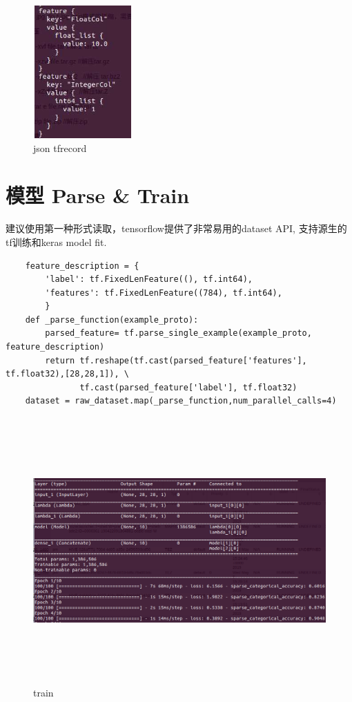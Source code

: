 \documentclass[12pt,a4paper,oneside]{article}
\begin{document}
\begin{CJK*}{UTF8}{gbsn}
\begin{figure}[H]
\centering
\includegraphics[width=1.5in,height=2in]{print2}
\caption{ json tfrecord}
\end{figure}

\section{模型 Parse \& Train}
建议使用第一种形式读取，tensorflow提供了非常易用的dataset API, 支持源生的tf训练和keras model fit.
\begin{lstlisting}
    feature_description = {
        'label': tf.FixedLenFeature((), tf.int64),
        'features': tf.FixedLenFeature((784), tf.int64),
        }
    def _parse_function(example_proto):
        parsed_feature= tf.parse_single_example(example_proto, feature_description)
        return tf.reshape(tf.cast(parsed_feature['features'], tf.float32),[28,28,1]), \
               tf.cast(parsed_feature['label'], tf.float32)
	dataset = raw_dataset.map(_parse_function,num_parallel_calls=4)
\end{lstlisting}

\begin{figure}[H]
\centering
\includegraphics[width=6in,height=4in]{train}
\caption{train}
\end{figure}


\end{CJK*}
\end{document}
